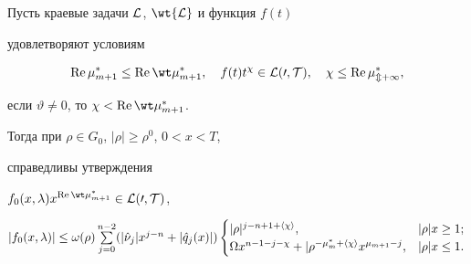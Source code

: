 \begin{lem}


Пусть краевые задачи $\cal L$, $\wt{\cal L}$ и функция $f(t)$


удовлетворяют условиям


$$


\re\mu^*_{m+1}\le\re\wt\mu^*_{m+1},\quad


f(t)t^\chi\in\cal L(0,T),\quad \chi\le\re\mu^*_{m+1},


$$


если $\vartheta\ne 0$, то $\chi<\re\wt\mu^*_{m+1}$.


Тогда при $\rho\in G_0$, $|\rho|\ge \rho^0$, $0<x<T$,


справедливы утверждения







$f_0(x,\lambda)x^{\re\wt\mu^*_{m+1}}\in\cal L(0,T)$,







$|f_0(x,\lambda)|\le\omega(\rho)\suml^{n-2}_{j=0}


(|\Hat\nu_j|x^{j-n}+|\Hat q_j(x)|)


\begin{cases}


|\rho|^{j-n+1+\la\chi\ra},& |\rho|x\ge 1;\\


\Omega x^{n-1-j-\chi}+|\rho^{-\mu^*_m+\la\chi\ra}


x^{\mu_{m+1}-j},& |\rho|x\le 1.


\end{cases}


$


\end{lem}





